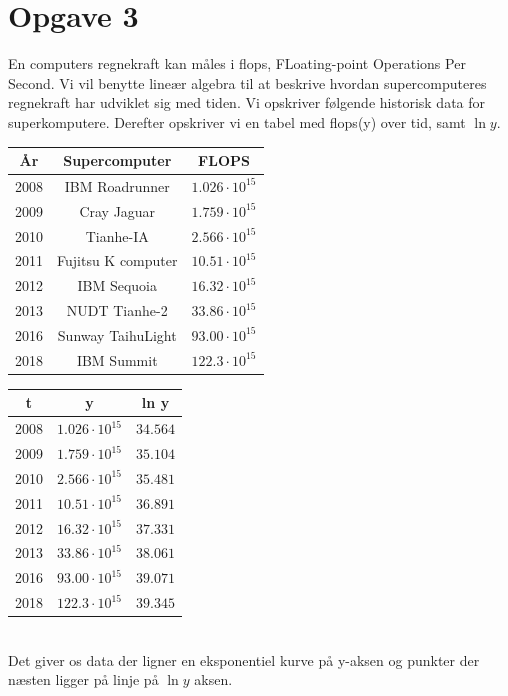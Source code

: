 \documentclass[a4paper,fleqn]{article}
\begin{document}
	\section{Opgave 3}
	En computers regnekraft kan måles i flops, FLoating-point Operations Per Second. Vi vil
	benytte lineær algebra til at beskrive hvordan supercomputeres regnekraft har udviklet sig
	med tiden. Vi opskriver følgende historisk data for superkomputere. Derefter opskriver vi
	en tabel med flops(y) over tid, samt $\ln y$. \\
	\begin{tabular}{|c|c|c|}\hline
		År & Supercomputer & FLOPS\\\hline\hline
		2008 & IBM Roadrunner & $1.026\cdot 10^{15}$ \\
		2009 & Cray Jaguar & $1.759\cdot 10^{15}$ \\
		2010 & Tianhe-IA & $2.566\cdot 10^{15}$ \\
		2011 & Fujitsu K computer & $10.51\cdot 10^{15}$ \\
		2012 & IBM Sequoia & $16.32\cdot 10^{15}$ \\
		2013 & NUDT Tianhe-2 & $33.86\cdot 10^{15}$ \\
		2016 & Sunway TaihuLight & $93.00\cdot 10^{15}$ \\
		2018 & IBM Summit & $122.3\cdot 10^{15}$ \\\hline
	\end{tabular}\hspace{5em}
	\begin{tabular}{|c|c|c|}\hline
		t & y & ln y\\\hline\hline
		2008 & $1.026\cdot 10^{15}$ & $34.564$\\
		2009 & $1.759\cdot 10^{15}$ & $35.104$\\
		2010 & $2.566\cdot 10^{15}$ & $35.481$\\
		2011 & $10.51\cdot 10^{15}$ & $36.891$\\
		2012 & $16.32\cdot 10^{15}$ & $37.331$\\
		2013 & $33.86\cdot 10^{15}$ & $38.061$\\
		2016 & $93.00\cdot 10^{15}$ & $39.071$\\
		2018 & $122.3\cdot 10^{15}$ & $39.345$\\\hline
	\end{tabular}\\
	Det giver os data der ligner en eksponentiel kurve på y-aksen og punkter der næsten ligger
	på linje på $\ln y$ aksen. \\
\end{document}
